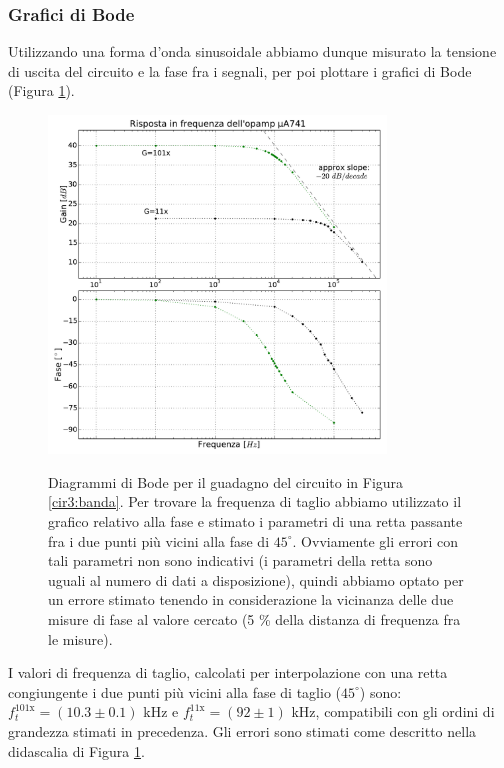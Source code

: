 \subsubsection{Grafici di Bode}

Utilizzando una forma d'onda sinusoidale abbiamo dunque misurato la tensione di uscita del circuito e la fase fra i segnali, per poi plottare i grafici di Bode (Figura \ref{gr3:bode}).

\begin{figure}[ht]
 \centering
   {\includegraphics[width=0.8\textwidth]{../E03/latex/bode.pdf}}
 \caption{Diagrammi di Bode per il guadagno del circuito in Figura \ref{cir3:banda}. Per trovare la frequenza di taglio abbiamo utilizzato il grafico relativo alla fase e stimato i parametri di una retta passante fra i due punti più vicini alla fase di $45^{\circ}$. Ovviamente gli errori con tali parametri non sono indicativi (i parametri della retta sono uguali al numero di dati a disposizione), quindi abbiamo optato per un errore stimato tenendo in considerazione la vicinanza delle due misure di fase al valore cercato (5 \% della distanza di frequenza fra le misure).}
 \label{gr3:bode}
\end{figure}

I valori di frequenza di taglio, calcolati per interpolazione con una retta congiungente i due punti più vicini alla fase di taglio ($45^{\circ}$) sono: $f_t^{101\mathrm{x}} = (10.3 \pm 0.1)$ \si{\kHz} e $f_t^{11\mathrm{x}} = (92 \pm 1)$ \si{\kHz}, compatibili con gli ordini di grandezza stimati in precedenza. Gli errori sono stimati come descritto nella didascalia di Figura \ref{gr3:bode}.

